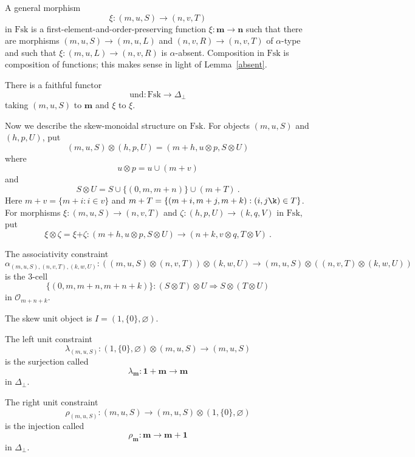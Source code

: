 \documentclass[a4paper,12pt,reqno]{amsart}
\theoremstyle{definition}
\theoremstyle{fact}
\theoremstyle{genquest}
\theoremstyle{step}
\newcommand{\lra}{\longrightarrow}
\newcommand{\Lra}{\Longrightarrow}
\def\CO{{\mathscr O}}
\begin{document}
A general morphism
\begin{equation}
\xi : (m,u,S) \lra (n,v,T)
\end{equation}
in $\mathrm{Fsk}$ is a first-element-and-order-preserving function
$\xi : \mathbf{m} \lra \mathbf{n}$
such that there are morphisms $(m,u,S)\lra (m,u,L)$ and $(n,v,R)\lra (n,v,T)$
of $\alpha$-type and such that $\xi : (m,u,L) \lra (n,v,R)$ is $\alpha$-absent. 
Composition in $\mathrm{Fsk}$ is composition of functions;
this makes sense in light of Lemma~\ref{absent}. 

There is a faithful functor 
\begin{equation}\label{und}
\mathrm{und} : \mathrm{Fsk} \lra \Delta_{\bot} 
\end{equation}
taking $(m,u,S)$ to $\mathbf{m}$ and $\xi$ to $\xi$. 

Now we describe the skew-monoidal structure on $\mathrm{Fsk}$.
For objects $(m,u,S)$ and $(h,p,U)$, put
\begin{equation}
(m,u,S)\otimes (h,p,U) = (m+h,u\otimes p,S\otimes U) 
\end{equation}
where $$u\otimes p = u\cup (m+v)$$
and $$S\otimes U = S\cup \{(0,m,m+n)\} \cup (m+T) \ .$$
Here $m+v = \{m+i : i\in v\}$ and $m+T = \{(m+i,m+j,m+k) : (i,j\k) \in T\}$.  
For morphisms $\xi : (m,u,S) \lra (n,v,T)$ and $\zeta : (h,p,U) \lra (k,q,V)$ in
$\mathrm{Fsk}$, put
\begin{equation}
\xi \otimes \zeta = \xi \mathbf{+} \zeta : (m+h,u\otimes p,S\otimes U) \lra (n+k,v\otimes q,T\otimes V) \ .
\end{equation}

The associativity constraint
\begin{equation}
\alpha_{(m,u,S),(n,v,T),(k,w,U)} : ((m,u,S)\otimes (n,v,T))\otimes (k,w,U) \rightarrow (m,u,S)\otimes ((n,v,T)\otimes (k,w,U))
\end{equation}
is the 3-cell 
$$\{(0,m,m+n,m+n+k)\} : (S\otimes T)\otimes U \Lra S\otimes (T\otimes U)$$ 
in $\CO_{m+n+k}$. 

The skew unit object is $I = (1,\{0\},\varnothing)$.

The left unit constraint 
\begin{equation}
\lambda_{(m,u,S)} :  (1,\{0\},\varnothing)\otimes (m,u,S) \lra (m,u,S)
\end{equation}
is the surjection called 
$$\lambda_{\mathbf{m}} : \mathbf{1+m} \lra \mathbf{m}$$
in $\Delta_{\bot}$.
 
The right unit constraint 
\begin{equation}
\rho_{(m,u,S)} :  (m,u,S) \lra (m,u,S) \otimes (1,\{0\},\varnothing)
\end{equation}
is the injection called 
$$\rho_{\mathbf{m}} : \mathbf{m} \lra \mathbf{m+1}$$
in $\Delta_{\bot}$.
\end{document}
